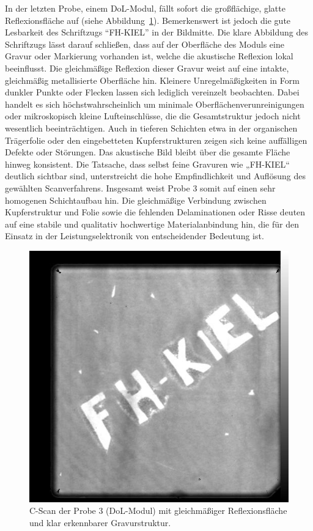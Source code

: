 In der letzten Probe, einem DoL-Modul, fällt sofort die großflächige, glatte Reflexionsfläche auf (siehe Abbildung~\ref{Abbildung 12:probe3}). Bemerkenswert ist jedoch die gute Lesbarkeit des Schriftzugs \enquote{FH-KIEL} in der Bildmitte. Die klare Abbildung des Schriftzugs lässt darauf schließen, dass auf der Oberfläche des Moduls eine Gravur oder Markierung vorhanden ist, welche die akustische Reflexion lokal beeinflusst. Die gleichmäßige Reflexion dieser Gravur weist auf eine intakte, gleichmäßig metallisierte Oberfläche hin. Kleinere Unregelmäßigkeiten in Form dunkler Punkte oder Flecken lassen sich lediglich vereinzelt beobachten. Dabei handelt es sich höchstwahrscheinlich um minimale Oberflächenverunreinigungen oder mikroskopisch kleine Lufteinschlüsse, die die Gesamtstruktur jedoch nicht wesentlich beeinträchtigen. Auch in tieferen Schichten etwa in der organischen Trägerfolie oder den eingebetteten Kupferstrukturen zeigen sich keine auffälligen Defekte oder Störungen. Das akustische Bild bleibt über die gesamte Fläche hinweg konsistent. Die Tatsache, dass selbst feine Gravuren wie „FH-KIEL“ deutlich sichtbar sind, unterstreicht die hohe Empfindlichkeit und Auflösung des gewählten Scanverfahrens. Insgesamt weist Probe 3 somit auf einen sehr homogenen Schichtaufbau hin. Die gleichmäßige Verbindung zwischen Kupferstruktur und Folie sowie die fehlenden Delaminationen oder Risse deuten auf eine stabile und qualitativ hochwertige Materialanbindung hin, die für den Einsatz in der Leistungselektronik von entscheidender Bedeutung ist.
\vspace{0.2cm}
\begin{figure}[H]
    \centering
    \includegraphics[scale=0.30]{Bilder/Probe3_i795_c.jpg}
    \caption{C-Scan der Probe 3 (DoL-Modul) mit gleichmäßiger Reflexionsfläche und klar erkennbarer Gravurstruktur.}
    \label{Abbildung 12:probe3}
\end{figure}
